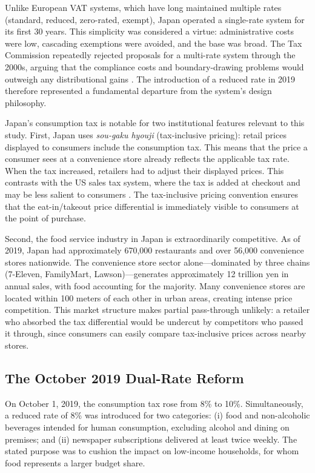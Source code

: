 \documentclass[12pt]{article}
\begin{document}
Unlike European VAT systems, which have long maintained multiple rates (standard, reduced, zero-rated, exempt), Japan operated a single-rate system for its first 30 years. This simplicity was considered a virtue: administrative costs were low, cascading exemptions were avoided, and the base was broad. The Tax Commission repeatedly rejected proposals for a multi-rate system through the 2000s, arguing that the compliance costs and boundary-drawing problems would outweigh any distributional gains \citep{japan_tax_commission2018}. The introduction of a reduced rate in 2019 therefore represented a fundamental departure from the system's design philosophy.

Japan's consumption tax is notable for two institutional features relevant to this study. First, Japan uses \textit{sou-gaku hyouji} (tax-inclusive pricing): retail prices displayed to consumers include the consumption tax. This means that the price a consumer sees at a convenience store already reflects the applicable tax rate. When the tax increased, retailers had to adjust their displayed prices. This contrasts with the US sales tax system, where the tax is added at checkout and may be less salient to consumers \citep{chetty2009salience}. The tax-inclusive pricing convention ensures that the eat-in/takeout price differential is immediately visible to consumers at the point of purchase.

Second, the food service industry in Japan is extraordinarily competitive. As of 2019, Japan had approximately 670,000 restaurants and over 56,000 convenience stores nationwide. The convenience store sector alone---dominated by three chains (7-Eleven, FamilyMart, Lawson)---generates approximately 12 trillion yen in annual sales, with food accounting for the majority. Many convenience stores are located within 100 meters of each other in urban areas, creating intense price competition. This market structure makes partial pass-through unlikely: a retailer who absorbed the tax differential would be undercut by competitors who passed it through, since consumers can easily compare tax-inclusive prices across nearby stores.

\subsection{The October 2019 Dual-Rate Reform}

On October 1, 2019, the consumption tax rose from 8\% to 10\%. Simultaneously, a reduced rate of 8\% was introduced for two categories: (i) food and non-alcoholic beverages intended for human consumption, excluding alcohol and dining on premises; and (ii) newspaper subscriptions delivered at least twice weekly. The stated purpose was to cushion the impact on low-income households, for whom food represents a larger budget share.
\end{document}
